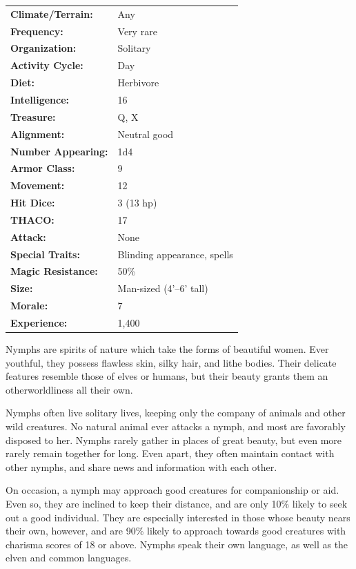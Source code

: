 \begin{multicols}{2}
\begin{minipage}{\columnwidth}
\noindent \begin{tabular}{p{}p{}}
\textbf{Climate/Terrain:}	& Any	\\
\textbf{Frequency:} 		& Very rare	\\
\textbf{Organization:} 		& Solitary	\\
\textbf{Activity Cycle:} 	& Day	\\
\textbf{Diet:} 				& Herbivore	\\
\textbf{Intelligence:} 		& 16	\\
\textbf{Treasure:} 			& Q, X	\\
\textbf{Alignment:} 		& Neutral good	\\
\hline
\textbf{Number Appearing:} 	& 1d4	\\
\textbf{Armor Class:} 		& 9	\\
\textbf{Movement:} 			& 12	\\
\textbf{Hit Dice:} 			& 3	(13 hp) \\
\textbf{THACO:} 			& 17	\\
\textbf{Attack:} 			& None	\\
\textbf{Special Traits:} & Blinding appearance, spells	\\
\textbf{Magic Resistance:} 	& 50\%	\\
\textbf{Size:} 				& Man-sized (4'--6' tall)	\\
\textbf{Morale:} 			& 7	\\
\textbf{Experience:} 		& 1,400	\\
\end{tabular}

\end{minipage}

Nymphs are spirits of nature which take the forms of beautiful women. Ever youthful, they possess flawless skin, silky hair, and lithe bodies. Their delicate features resemble those of elves or humans, but their beauty grants them an otherworldliness all their own.

Nymphs often live solitary lives, keeping only the company of animals and other wild creatures. No natural animal ever attacks a nymph, and most are favorably disposed to her. Nymphs rarely gather in places of great beauty, but even more rarely remain together for long. Even apart, they often maintain contact with other nymphs, and share news and information with each other.

On occasion, a nymph may approach good creatures for companionship or aid. Even so, they are inclined to keep their distance, and are only 10\% likely to seek out a good individual. They are especially interested in those whose beauty nears their own, however, and are 90\% likely to approach towards good creatures with charisma scores of 18 or above. Nymphs speak their own language, as well as the elven and common languages.


\end{multicols}
